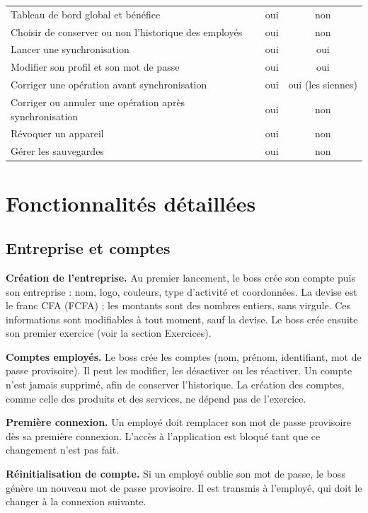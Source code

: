 \documentclass[11pt,a4paper]{article}
\newcommand{\fonc}[2]{\textbf{#1.} #2\par\vspace{0.2em}}
\begin{document}
\begin{center}
\begin{tabular}{p{7.2cm} c c}
			Tableau de bord global et bénéfice & oui & non \\
			Choisir de conserver ou non l'historique des employés & oui & non \\
			Lancer une synchronisation & oui & oui \\
			Modifier son profil et son mot de passe & oui & oui \\
			Corriger une opération avant synchronisation & oui & oui (les siennes) \\
			Corriger ou annuler une opération après synchronisation & oui & non \\
			Révoquer un appareil & oui & non \\
			Gérer les sauvegardes & oui & non \\
			\bottomrule
		\end{tabular}
	\end{center}

	\section{Fonctionnalités détaillées}

	\subsection{Entreprise et comptes}

	\fonc{Création de l'entreprise}{Au premier lancement, le boss crée son compte puis son entreprise : nom, logo, couleurs, type d'activité et coordonnées. La devise est le franc CFA (FCFA) ; les montants sont des nombres entiers, sans virgule. Ces informations sont modifiables à tout moment, sauf la devise. Le boss crée ensuite son premier exercice (voir la section Exercices).}

	\fonc{Comptes employés}{Le boss crée les comptes (nom, prénom, identifiant, mot de passe provisoire). Il peut les modifier, les désactiver ou les réactiver. Un compte n'est jamais supprimé, afin de conserver l'historique. La création des comptes, comme celle des produits et des services, ne dépend pas de l'exercice.}

	\fonc{Première connexion}{Un employé doit remplacer son mot de passe provisoire dès sa première connexion. L'accès à l'application est bloqué tant que ce changement n'est pas fait.}

	\fonc{Réinitialisation de compte}{Si un employé oublie son mot de passe, le boss génère un nouveau mot de passe provisoire. Il est transmis à l'employé, qui doit le changer à la connexion suivante.}
\end{document}
